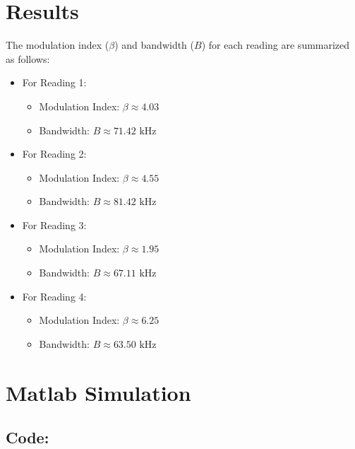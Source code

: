 \documentclass[12pt]{article}
\begin{document}
\section*{Results}
The modulation index (\( \beta \)) and bandwidth (\( B \)) for each reading are summarized as follows:
\begin{itemize}
    \item For Reading 1:
          \begin{itemize}
              \item Modulation Index: \( \beta \approx 4.03 \)
              \item Bandwidth: \( B \approx 71.42 \text{ kHz} \)
          \end{itemize}
    \item For Reading 2:
          \begin{itemize}
              \item Modulation Index: \( \beta \approx 4.55 \)
              \item Bandwidth: \( B \approx 81.42 \text{ kHz} \)
          \end{itemize}
    \item For Reading 3:
          \begin{itemize}
              \item Modulation Index: \( \beta \approx 1.95 \)
              \item Bandwidth: \( B \approx 67.11 \text{ kHz} \)
          \end{itemize}
    \item For Reading 4:
          \begin{itemize}
              \item Modulation Index: \( \beta \approx 6.25 \)
              \item Bandwidth: \( B \approx 63.50 \text{ kHz} \)
          \end{itemize}
\end{itemize}


\section*{Matlab Simulation}

\subsection*{Code:}
\end{document}
